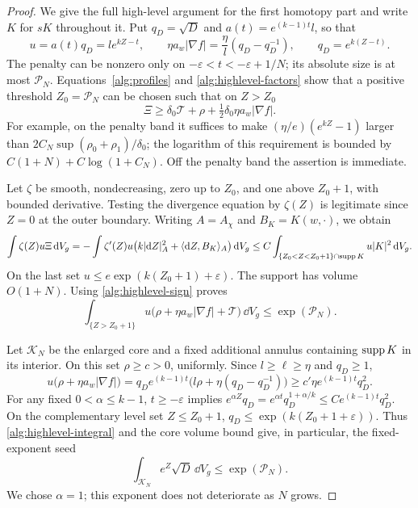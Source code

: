 \begin{proof}
We give the full high-level argument for the first homotopy part and write
$K$ for $sK$ throughout it.  Put $q_D=\sqrt D$ and
$a(t)=e^{(k-1)t}l$, so that
\begin{equation}
 u=a(t)q_D=l e^{kZ-t},\qquad
 \eta a_w|\nabla f|=\frac\eta l(q_D-q_D^{-1}),\qquad
 q_D=e^{k(Z-t)}.
 \label{alg:highlevel-factors}
\end{equation}
The penalty can be nonzero only on
$-\varepsilon<t<-\varepsilon+1/N$; its absolute size is at most
$\mathcal P_N$.  Equations~\eqref{alg:profiles} and
\eqref{alg:highlevel-factors} show that a positive threshold
$Z_0=\mathcal P_N$ can be chosen such that on $Z>Z_0$
\begin{equation}
 \Xi\geq\delta_0\mathcal T+\rho
                +\tfrac12\delta_0\eta a_w|\nabla f|.
 \label{alg:highlevel-sign}
\end{equation}
For example, on the penalty band it suffices to make
$(\eta/e)(e^{kZ}-1)$ larger than
$2C_N\sup(\rho_0+\rho_1)/\delta_0$; the logarithm of this requirement
is bounded by $C(1+N)+C\log(1+C_N)$.  Off the penalty band the
assertion is immediate.

Let $\zeta$ be smooth, nondecreasing, zero up to $Z_0$, and one
above $Z_0+1$, with bounded derivative.  Testing the divergence equation
by $\zeta(Z)$ is legitimate since $Z=0$ at the outer boundary.
Writing $A=A_\chi$ and $B_K=K(w,\cdot)$, we obtain
\[
 \int\zeta(Z)u\Xi\,\mathrm d V_g
 =-\int\zeta'(Z)u
       \bigl(k|\mathrm d Z|_A^2+\langle\mathrm d Z,B_K\rangle_A\bigr)\,\mathrm d V_g
 \leq C\int_{\{Z_0<Z<Z_0+1\}\cap\operatorname{supp} K}u|K|^2\,\mathrm d V_g.
\]
On the last set $u\leq e\exp(k(Z_0+1)+\varepsilon)$.
The support has volume $O(1+N)$.  Using
\eqref{alg:highlevel-sign} proves
\begin{equation}
 \int_{\{Z>Z_0+1\}}u
    \bigl(\rho+\eta a_w|\nabla f|+\mathcal T\bigr)\,\dd V_g
 \leq\exp(\mathcal P_N).
 \label{alg:highlevel-integral}
\end{equation}

Let $\mathcal K_N$ be the enlarged core and a fixed additional annulus
containing $\operatorname{supp} K$ in its interior.  On this set $\rho\geq c>0$,
uniformly.  Since $l\geq\ell\geq\eta$ and $q_D\geq1$,
\[
 u\bigl(\rho+\eta a_w|\nabla f|\bigr)
 =q_De^{(k-1)t}\bigl(l\rho+\eta(q_D-q_D^{-1})\bigr)
 \geq c'\eta e^{(k-1)t}q_D^2.
\]
For any fixed $0<\alpha\leq k-1$, $t\geq-\varepsilon$ implies
$e^{\alpha Z}q_D=e^{\alpha t}q_D^{1+\alpha/k}
 \leq C e^{(k-1)t}q_D^2$.
On the complementary level set $Z\leq Z_0+1$,
$q_D\leq\exp(k(Z_0+1+\varepsilon))$.  Thus
\eqref{alg:highlevel-integral} and the core volume bound give, in
particular, the fixed-exponent seed
\begin{equation}
 \int_{\mathcal K_N}e^Z\sqrt D\,\dd V_g
 \leq\exp(\mathcal P_N).
 \label{alg:seed-integral}
\end{equation}
We chose $\alpha=1$; this exponent does not deteriorate as $N$ grows.


\end{proof}
